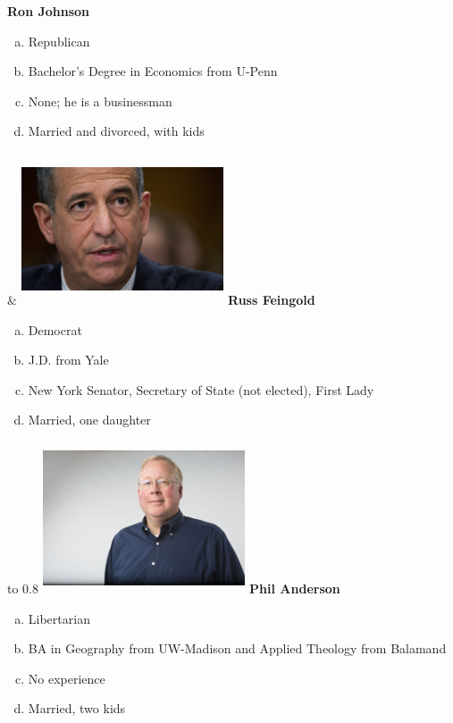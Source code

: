 \documentclass[twoside]{article}
\begin{document}
\begin{center}
\begin{tabu}
 \vskip0.5cm
 {\bfseries\Large Ron Johnson}
 \begin{enumerate}[a)]
   \item Republican
   \item Bachelor's Degree in Economics from U-Penn
   \item None; he is a businessman
   \item Married and divorced, with kids
 \end{enumerate}
 &
 \includegraphics[width=6cm,height=4.5cm]{images/profiles/feingold.jpeg}
  \vskip0.5cm
 {\bfseries\Large Russ Feingold}
 \begin{enumerate}[a)]
   \item Democrat
   \item J.D. from Yale
   \item New York Senator, Secretary of State (not elected), First Lady
   \item Married, one daughter
 \end{enumerate}
 \end{tabu}
 \begin{tabu} to 0.8\textwidth { X[c] X[c]}
  \includegraphics[width=6cm,height=4.5cm]{images/profiles/anderson.jpg}
 \vskip0.5cm
 {\bfseries\Large Phil Anderson}
 \begin{enumerate}[a)]
\item Libertarian
\item BA in Geography from UW-Madison and Applied Theology from Balamand
\item No experience
\item Married, two kids
 \end{enumerate}

\end{tabu}
\end{center}
\end{document}
